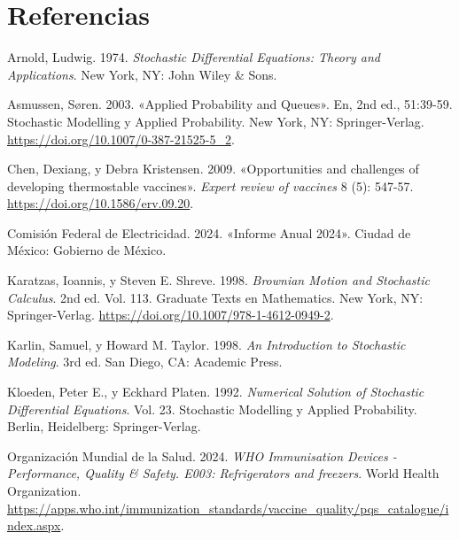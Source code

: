 \documentclass[
  spanish,
  letterpaper,
  DIV=11,
  numbers=noendperiod]{scrreprt}
\newlength{\cslhangindent}
\newenvironment{CSLReferences}[2] %
 {\begin{list}{}{%
  \setlength{\itemindent}{0pt}
  \setlength{\leftmargin}{0pt}
  \setlength{\parsep}{0pt}
  \ifodd #1
   \setlength{\leftmargin}{\cslhangindent}
   \setlength{\itemindent}{-1\cslhangindent}
  \fi
  \setlength{\itemsep}{#2\baselineskip}}}
 {\end{list}}
\theoremstyle{plain}
\theoremstyle{definition}
\theoremstyle{remark}
\begin{document}

\chapter*{Referencias}\label{referencias}


\label{refs}
\begin{CSLReferences}{1}{0}
Arnold, Ludwig. 1974. \emph{Stochastic Differential Equations: Theory
and Applications}. New York, NY: John Wiley \& Sons.

Asmussen, Søren. 2003. {«Applied Probability and Queues»}. En, 2nd ed.,
51:39-59. Stochastic Modelling y Applied Probability. New York, NY:
Springer-Verlag. \url{https://doi.org/10.1007/0-387-21525-5_2}.

Chen, Dexiang, y Debra Kristensen. 2009. {«Opportunities and challenges
of developing thermostable vaccines»}. \emph{Expert review of vaccines}
8 (5): 547-57. \url{https://doi.org/10.1586/erv.09.20}.

Comisión Federal de Electricidad. 2024. {«Informe Anual 2024»}. Ciudad
de México: Gobierno de México.

Karatzas, Ioannis, y Steven E. Shreve. 1998. \emph{Brownian Motion and
Stochastic Calculus}. 2nd ed. Vol. 113. Graduate Texts en Mathematics.
New York, NY: Springer-Verlag.
\url{https://doi.org/10.1007/978-1-4612-0949-2}.

Karlin, Samuel, y Howard M. Taylor. 1998. \emph{An Introduction to
Stochastic Modeling}. 3rd ed. San Diego, CA: Academic Press.

Kloeden, Peter E., y Eckhard Platen. 1992. \emph{Numerical Solution of
Stochastic Differential Equations}. Vol. 23. Stochastic Modelling y
Applied Probability. Berlin, Heidelberg: Springer-Verlag.

Organización Mundial de la Salud. 2024. \emph{WHO Immunisation Devices -
Performance, Quality \& Safety. E003: Refrigerators and freezers}. World
Health Organization.
\url{https://apps.who.int/immunization_standards/vaccine_quality/pqs_catalogue/index.aspx}.


\end{CSLReferences}
\end{document}
